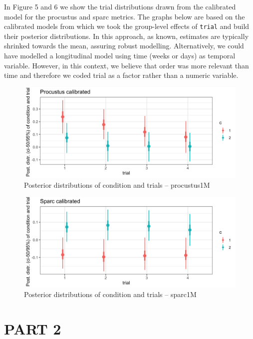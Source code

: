 \documentclass[
]{article}
\begin{document}
In Figure 5 and 6 we show the trial distributions drawn from the
calibrated model for the procustus and sparc metrics. The graphs below
are based on the calibrated models from which we took the group-level
effects of \texttt{trial} and build their posterior distributions. In
this approach, as known, estimates are typically shrinked towards the
mean, assuring robust modelling. Alternatively, we could have modelled a
longitudinal model using time (weeks or days) as temporal variable.
However, in this context, we believe that order was more relevant than
time and therefore we coded trial as a factor rather than a numeric
variable.

\begin{figure}
\centering
\includegraphics{FiguresPaper/ConditionTrialsPostDistr_procustus1M.png}
\caption{Posterior distributions of condition and trials -- procustus1M}
\end{figure}

\begin{figure}
\centering
\includegraphics{FiguresPaper/ConditionTrialsPostDistr_sparc1M.png}
\caption{Posterior distributions of condition and trials -- sparc1M}
\end{figure}

\hypertarget{part-2}{%
\section{PART 2}\label{part-2}}
\end{document}
